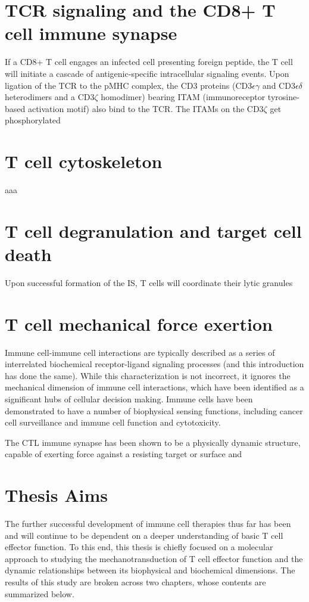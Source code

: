 \section{TCR signaling and the CD8+ T cell immune synapse}
If a CD8+ T cell engages an infected cell presenting foreign peptide, the T cell will initiate a cascade of antigenic-specific intracellular signaling events. Upon ligation of the TCR to the pMHC complex, the CD3 proteins (CD3$\epsilon \gamma$ and CD3$\epsilon \delta$ heterodimers and a CD3$\zeta$ homodimer) bearing ITAM (immunoreceptor tyrosine-based activation motif) also bind to the TCR. The ITAMs on the CD3$\zeta$ get phosphorylated 

\section{T cell cytoskeleton}
aaa 

\section{T cell degranulation and target cell death}
Upon successful formation of the IS, T cells will coordinate their lytic granules 

\section{T cell mechanical force exertion}
Immune cell-immune cell interactions are typically described as a series of interrelated biochemical receptor-ligand signaling processes (and this introduction has done the same). While this characterization is not incorrect, it ignores the mechanical dimension of immune cell interactions, which have been identified as a significant hubs of cellular decision making. Immune cells have been demonstrated to have a number of biophysical sensing functions, including cancer cell surveillance and immune cell function and cytotoxicity.

The CTL immune synapse has been shown to be a physically dynamic structure, capable of exerting force against a resisting target or surface and 

\section{Thesis Aims}
The further successful development of immune cell therapies thus far has been and will continue to be dependent on a deeper understanding of basic T cell effector function. To this end, this thesis is chiefly focused on a molecular approach to studying the mechanotransduction of T cell effector function and the dynamic relationships between its biophysical and biochemical dimensions. The results of this study are broken across two chapters, whose contents are summarized below.

